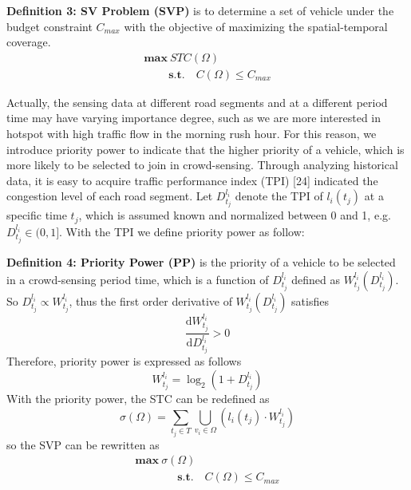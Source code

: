 \documentclass[journal]{IEEEtran}
\begin{document}
\noindent
\textbf{Definition 3: SV Problem (SVP)} is to determine a set of vehicle under the budget constraint $C_{max}$ with the objective of maximizing the spatial-temporal coverage.
\begin{equation}
\begin{matrix}
\textbf{max} \ STC(\Omega )\\\quad\quad\
\textbf{s.t.}\quad C(\Omega)\leqslant C_{max}\end{matrix}
\end{equation}

Actually, the sensing data at different road segments and at a different period time may have varying importance degree, such as we are more interested in hotspot with high traffic flow in the morning rush hour. For this reason, we introduce priority power to indicate that the higher priority  of a vehicle, which is more likely to be selected to join in crowd-sensing. Through analyzing historical data, it is easy to acquire traffic performance index (TPI) [24] indicated the congestion level of each road segment. Let $D_{t_{j}}^{l_{i}}$ denote the TPI of $l_{i} (t_{j})$ at a specific time $t_{j}$, which is assumed known and normalized between 0 and 1, e.g. $D_{t_{j}}^{l_{i}}\in (0,1]$. With the TPI we define priority power as follow:

\noindent
\textbf{Definition 4: Priority Power (PP)} is the priority of a vehicle to be selected in a crowd-sensing period time, which is a function of  $D_{t_{j}}^{l_{i}}$ defined as $W_{t_{j}}^{l_{i}}(D_{t_{j}}^{l_{i}})$. So $D_{t_{j}}^{l_{i}}\propto W_{t_{j}}^{l_{i}}$, thus the first order derivative of $W_{t_{j}}^{l_{i}}(D_{t_{j}}^{l_{i}})$ satisfies
\begin{equation}
\frac{\mathrm{d}W_{t_{j}}^{l_{i}} }{\mathrm{d}D_{t_{j}}^{l_{i}}}> 0
\end{equation}
Therefore, priority power is expressed as follows
\begin{equation}
W_{t_{j}}^{l_{i}}=\log_{2}(1+D_{t_{j}}^{l_{i}})
\end{equation}
With the priority power, the STC can be redefined as
\begin{equation}
\sigma (\Omega )=\sum_{t_{j}\in T}\bigcup_{v_{i}\in \Omega }(l_{i}(t_{j})\cdot W_{t_{j}}^{l_{i}})
\end{equation}
so the SVP can be rewritten as
\begin{equation}
\begin{matrix}
\textbf{max}\  \sigma(\Omega)\\\quad\quad\quad\;\;\
\textbf{s.t.}\quad C(\Omega)\leqslant C_{max}\end{matrix}
\end{equation}
\end{document}
